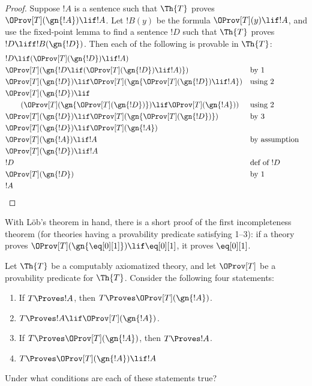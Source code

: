 \documentclass[../../../include/open-logic-section]{subfiles}
\begin{document}
\begin{proof}
Suppose $!A$ is a sentence such that $\Th{T}$ proves
$\OProv[T](\gn{!A}) \lif !A$. Let $!B(y)$ be the formula $\OProv[T](y)
\lif !A$, and use the fixed-point lemma to find a sentence $!D$
such that $\Th{T}$ proves $!D \liff !B(\gn{!D})$. Then each of the
following is provable in $\Th{T}$:
\begin{align*}
& !D \lif (\OProv[T](\gn{!D}) \lif !A) \\
& \OProv[T](\gn{!D \lif (\OProv[T](\gn{!D}) \lif !A)}) && \text{by 1} \\
& \OProv[T](\gn{!D}) \lif \OProv[T](\gn{\OProv[T](\gn{!D}) \lif !A})
  && \text{using 2} \\
& \OProv[T](\gn{!D}) \lif \\
&\qquad(\OProv[T](\gn{\OProv[T](\gn{!D})}) \lif \OProv[T](\gn{!A}))
  && \text{using 2} \\
& \OProv[T](\gn{!D}) \lif \OProv[T](\gn{\OProv[T](\gn{!D})}) 
  && \text{by 3} \\
& \OProv[T](\gn{!D}) \lif \OProv[T](\gn{!A})  \\
& \OProv[T](\gn{!A}) \lif !A && \text{by assumption} \\
& \OProv[T](\gn{!D}) \lif !A \\
& !D && \text{def of $!D$} \\
& \OProv[T](\gn{!D}) && \text{by 1} \\
& !A
\end{align*}
\end{proof}

With L\"ob's theorem in hand, there is a short proof of the first
incompleteness theorem (for theories having a provability predicate
satisfying 1--3): if a theory proves $\OProv[T](\gn{\eq[0][1]}) \lif
\eq[0][1]$, it proves $\eq[0][1]$. 


\begin{prob}
Let $\Th{T}$ be a computably axiomatized theory, and
let $\OProv[T]$ be a provability predicate for $\Th{T}$. Consider the
following four statements:
\begin{enumerate}
\item If $T \Proves !A$, then $T \Proves \OProv[T](\gn{!A})$.
\item $T \Proves !A \lif \OProv[T](\gn{!A})$.
\item If $T \Proves \OProv[T](\gn{!A})$, then $T \Proves !A$.
\item $T \Proves \OProv[T](\gn{!A}) \lif !A$
\end{enumerate}
Under what conditions are each of these statements true?
\end{prob}
\end{document}
